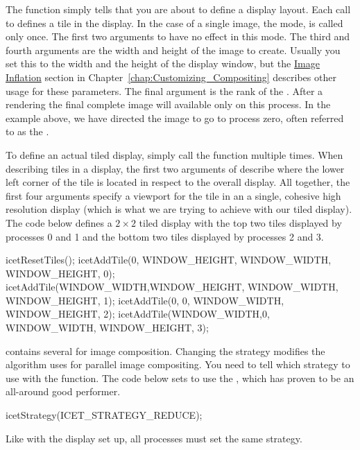 The  function simply tells \IceT that you are about
to define a display layout.  Each call to  defines a
tile in the display.  In the case of a single image, the
 mode,
 is called only once.  The first two arguments to
 have no effect in this mode.  The third and fourth
arguments are the width and height of the image to create.  Usually you set
this to the width and the height of the display window, but the
\hyperref[sec:Customizing_Compositing:Image_Inflation]{Image Inflation}
section in Chapter~\ref{chap:Customizing_Compositing} describes other usage
for these parameters.  The final argument is the rank of the
.  After a rendering the
final complete image will available only on this process.  In the example
above, we have directed the image to go to process zero, often referred to
as the .

To define an actual tiled display, simply call the 
function multiple times.  When describing tiles in a display, the first two
arguments of  describe where the lower left corner of
the tile is located in respect to the overall display.  All together, the
first four arguments specify a viewport for the tile in an a single,
cohesive high resolution display (which is what we are trying to achieve
with our tiled display).  The code below defines a $2 \times 2$ tiled
display with the top two tiles displayed by processes 0 and 1 and the
bottom two tiles displayed by processes 2 and 3.
\begin{code}
    icetResetTiles();
    icetAddTile(0,           WINDOW_HEIGHT, WINDOW_WIDTH, WINDOW_HEIGHT, 0);
    icetAddTile(WINDOW_WIDTH,WINDOW_HEIGHT, WINDOW_WIDTH, WINDOW_HEIGHT, 1);
    icetAddTile(0,           0,             WINDOW_WIDTH, WINDOW_HEIGHT, 2);
    icetAddTile(WINDOW_WIDTH,0,             WINDOW_WIDTH, WINDOW_HEIGHT, 3);
\end{code}

\IceT contains several  for image
composition.  Changing the strategy modifies the algorithm \IceT uses for
parallel image compositing.  You need to tell \IceT which strategy to use
with the  function.  The code below sets \IceT to use
the , which has proven to
be an all-around good performer.
\begin{code}
    icetStrategy(ICET_STRATEGY_REDUCE);
\end{code}
Like with the display set up, all processes must set the same strategy.

